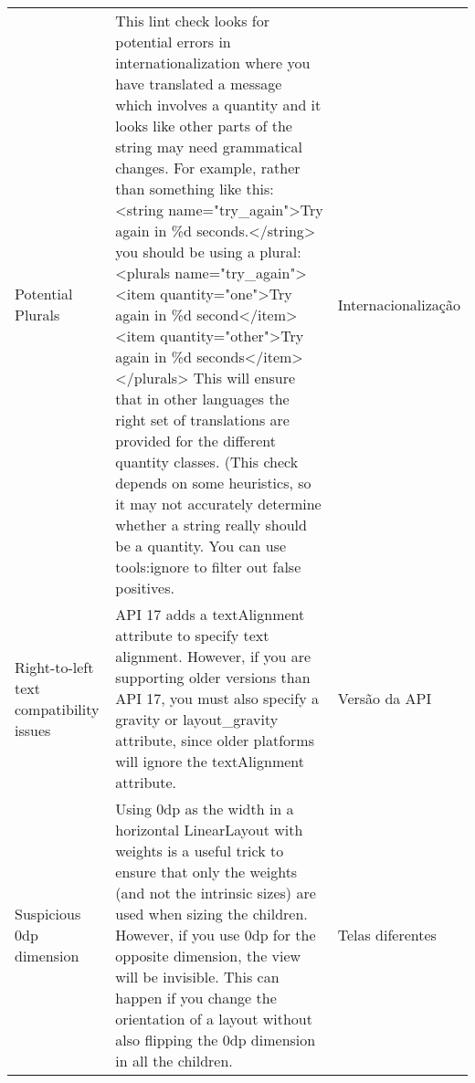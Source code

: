 \begin{landscape}
\begin{longtable}{p{30mm}|p{180mm}|p{25mm}}
Potential Plurals
&This lint check looks for potential errors in internationalization where you have translated a message which involves a quantity and it looks like other parts of the string may need grammatical changes.  For example, rather than something like this: <string name="try\_again">Try again in \%d seconds.</string> you should be using a plural: <plurals name="try\_again"> <item quantity="one">Try again in \%d second</item> <item quantity="other">Try again in \%d seconds</item> </plurals> This will ensure that in other languages the right set of translations are provided for the different quantity classes.  (This check depends on some heuristics, so it may not accurately determine whether a string really should be a quantity. You can use tools:ignore to filter out false positives.
&Internacionalização\\

Right-to-left text compatibility issues
&API 17 adds a textAlignment attribute to specify text alignment. However, if you are supporting older versions than API 17, you must also specify a gravity or layout\_gravity attribute, since older platforms will ignore the textAlignment attribute.
&Versão da API\\

Suspicious 0dp dimension
&Using 0dp as the width in a horizontal LinearLayout with weights is a useful trick to ensure that only the weights (and not the intrinsic sizes) are used when sizing the children.  However, if you use 0dp for the opposite dimension, the view will be invisible. This can happen if you change the orientation of a layout without also flipping the 0dp dimension in all the children.
&Telas diferentes\\
                                                                                                                                                                                                                                                                                                                                                                                                                                                                                                                                                                                                                                                                                                                                                                                                                                            

\end{longtable}
\end{landscape}
